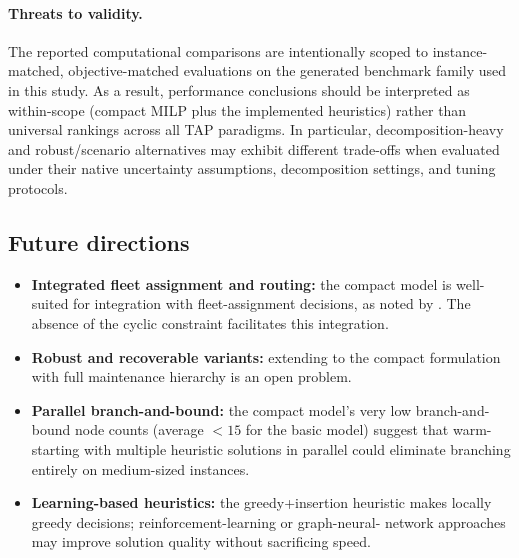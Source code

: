 \paragraph{Threats to validity.}
The reported computational comparisons are intentionally scoped to
instance-matched, objective-matched evaluations on the generated benchmark
family used in this study.  As a result, performance conclusions should be
interpreted as within-scope (compact MILP plus the implemented heuristics)
rather than universal rankings across all TAP paradigms.  In particular,
decomposition-heavy and robust/scenario alternatives may exhibit different
trade-offs when evaluated under their native uncertainty assumptions,
decomposition settings, and tuning protocols.

\subsection*{Future directions}

\begin{itemize}
  \item \textbf{Integrated fleet assignment and routing:} the compact model
    is well-suited for integration with fleet-assignment decisions, as noted
    by \citet{khaled2018compact}.  The absence of the cyclic constraint
    facilitates this integration.
  \item \textbf{Robust and recoverable variants:} extending
    \citet{borndorfer2010robust, froyland2013recoverable} to the compact
    formulation with full maintenance hierarchy is an open problem.
  \item \textbf{Parallel branch-and-bound:} the compact model's very low
    branch-and-bound node counts (average $< 15$ for the basic model) suggest
    that warm-starting with multiple heuristic solutions in parallel could
    eliminate branching entirely on medium-sized instances.
  \item \textbf{Learning-based heuristics:} the greedy+insertion heuristic
    makes locally greedy decisions; reinforcement-learning or graph-neural-
    network approaches may improve solution quality without sacrificing speed.
\end{itemize}
